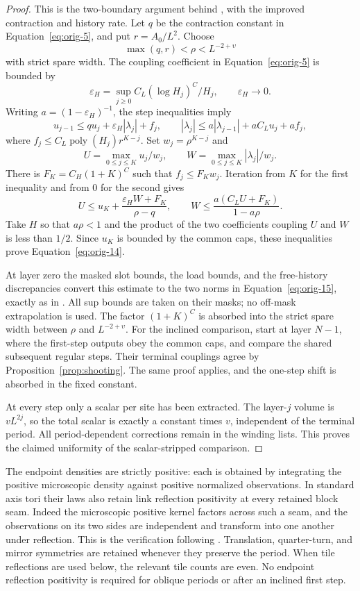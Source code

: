 \begin{proof}
This is the two-boundary argument behind , with
the improved contraction and history rate. Let $q$ be the contraction
constant in Equation~\eqref{eq:orig-5}, and put $r=A_0/L^2$. Choose
\[
 \max(q,r)<\rho<L^{-2+\upsilon}
\]
with strict spare width. The coupling coefficient in
Equation~\eqref{eq:orig-5} is bounded by
\[
 \varepsilon_H=\sup_{j\ge0}
 C_L(\log H_j)^C/H_j,
 \qquad \varepsilon_H\longrightarrow0.
\]
Writing $a=(1-\varepsilon_H)^{-1}$, the step inequalities imply
\[
 u_{j-1}\le q u_j+\varepsilon_H|\lambda_j|+f_j,
 \qquad
 |\lambda_j|\le a|\lambda_{j-1}|+aC_Lu_j+af_j,
\]
where $f_j\le C_L\operatorname{poly}(H_j)r^{K-j}$.
Set $w_j=\rho^{K-j}$ and
\[
 U=\max_{0\le j\le K}u_j/w_j,
 \qquad W=\max_{0\le j\le K}|\lambda_j|/w_j.
\]
There is $F_K=C_H(1+K)^C$ such that $f_j\le F_Kw_j$.
Iteration from $K$ for the first inequality and from $0$ for the
second gives
\[
 U\le u_K+\frac{\varepsilon_HW+F_K}{\rho-q},
 \qquad
 W\le\frac{a(C_LU+F_K)}{1-a\rho}.
\]
Take $H$ so that $a\rho<1$ and the product of the two coefficients
coupling $U$ and $W$ is less than $1/2$. Since $u_K$ is bounded by
the common caps, these inequalities prove
Equation~\eqref{eq:orig-14}.

At layer zero the masked slot bounds, the load bounds, and the
free-history discrepancies convert this estimate to the two norms
in Equation~\eqref{eq:orig-15}, exactly as in
. All sup bounds are taken on their
masks; no off-mask extrapolation is used. The factor $(1+K)^C$ is
absorbed into the strict spare width between $\rho$ and
$L^{-2+\upsilon}$. For the inclined comparison, start at layer
$N-1$, where the first-step outputs obey the common caps, and compare
the shared subsequent regular steps. Their terminal couplings agree
by Proposition~\ref{prop:shooting}. The same proof applies, and the
one-step shift is absorbed in the fixed constant.

At every step only a scalar per site has been extracted. The layer-$j$
volume is $vL^{2j}$, so the total scalar is exactly a constant times
$v$, independent of the terminal period. All period-dependent
corrections remain in the winding lists. This proves the claimed
uniformity of the scalar-stripped comparison.
\end{proof}

The endpoint densities are strictly positive: each is obtained by
integrating the positive microscopic density against positive
normalized observations. In standard axis tori their laws also retain
link reflection positivity at every retained block seam. Indeed the
microscopic positive kernel factors across such a seam, and the
observations on its two sides are independent and transform into one
another under reflection. This is the verification following
. Translation, quarter-turn, and mirror symmetries
are retained whenever they preserve the period. When tile reflections
are used below, the relevant tile counts are even. No endpoint
reflection positivity is required for oblique periods or after an
inclined first step.
